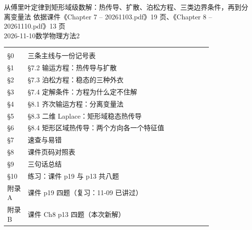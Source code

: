 \documentclass[11pt]{ctexart}
\newcommand{\tabmidrule}{\noalign{\vspace{1pt}{\color{petal}\hrule height 0.5pt}\vspace{1pt}}}
\renewcommand{\thead}[1]{\leavevmode{\bfseries\color{violetdeep}#1}}
\let\origsubhdr\subhdr
\renewcommand{\subhdr}[1]{\par\needspace{3\baselineskip}\origsubhdr{#1}}
\begin{document}
{从傅里叶定律到矩形域级数解：热传导、扩散、泊松方程、三类边界条件，再到分离变量法}
{依据课件《Chapter 7 -- 20261103.pdf》19 页、《Chapter 8 -- 20261110.pdf》13 页\\2026-11-10\quad 数学物理方法2}


\tabtop
\begin{tabular}{@{}p{0.10\linewidth}p{0.74\linewidth}r@{}}
\thead{节} & \thead{内容} & \thead{页} \\
\tabmidrule
§0 & 三条主线与一份记号表 & \pageref{sec:s0} \\
§1 & \S7.2 输运方程：热传导与扩散 & \pageref{sec:s1} \\
§2 & \S7.3 泊松方程：稳态的三种外衣 & \pageref{sec:s2} \\
§3 & \S7.4 定解条件：方程为什么定不住解 & \pageref{sec:s3} \\
§4 & \S8.1 齐次输运方程：分离变量法 & \pageref{sec:s4} \\
§5 & \S8.3 二维 Laplace：矩形域稳态热传导 & \pageref{sec:s5} \\
§6 & \S8.4 矩形区域热传导：两个方向各一个特征值 & \pageref{sec:s6} \\
§7 & 速查与易错 & \pageref{sec:s7} \\
§8 & 课件页码对照表 & \pageref{sec:s8} \\
§9 & 三句话总结 & \pageref{sec:s9} \\
§10 & 练习：课件 p19 与 p13 共八题 & \pageref{sec:practice} \\
附录 A & 课件 p19 四题（复习：11-09 已讲过） & \pageref{sec:appA} \\
附录 B & 课件 Ch8 p13 四题（本次新解） & \pageref{sec:appB} \\
\end{tabular}
\tabbot
\clearpage
\end{document}
